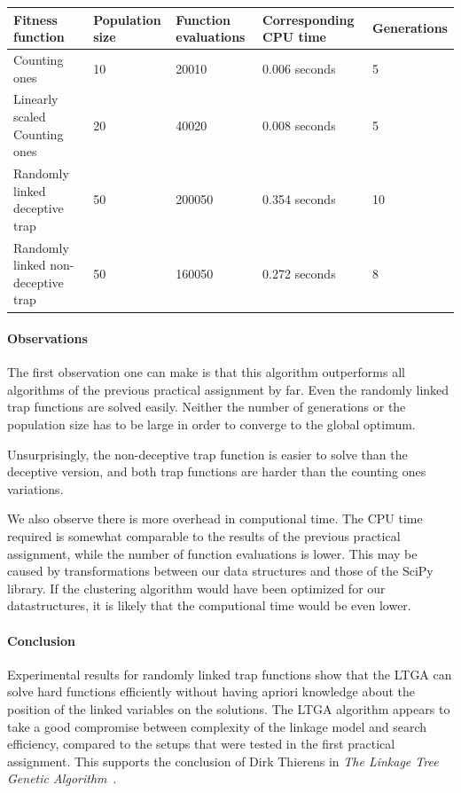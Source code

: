 \documentclass[12pt]{article}
\theoremstyle{definition}
\begin{document}
\begin{table}[!htb]
\begin{adjustwidth}{-2cm}{}
\centering
\begin{tabular}{lp{2.5cm}p{2.5cm}p{2.8cm}p{2.5cm}}
\toprule[1.5pt]
\bf Fitness function & \bf Population size & \bf Function evaluations & \bf Corresponding CPU time& \bf Generations\\\midrule
Counting ones & 10 & 20010 & 0.006 seconds & 5 \\
Linearly scaled Counting ones & 20 & 40020 & 0.008 seconds & 5 \\
Randomly linked deceptive trap & 50 & 200050 & 0.354 seconds & 10 \\
Randomly linked non-deceptive trap & 50 & 160050 & 0.272 seconds & 8 \\
\bottomrule[1.25pt]
\end{tabular}\par
\bigskip
{}
\label{tab:exp}
\end{adjustwidth}
\end{table}

\paragraph{Observations}
The first observation one can make is that this algorithm outperforms all algorithms of the
previous practical assignment by far.
Even the randomly linked trap functions are solved easily.
Neither the number of generations or the population size has to be large in order to
converge to the global optimum.

Unsurprisingly, the non-deceptive trap function is easier to solve than the deceptive version,
and both trap functions are harder than the counting ones variations.

We also observe there is more overhead in computional time.
The CPU time required is somewhat comparable to the results of the previous practical assignment,
while the number of function evaluations is lower.
This may be caused by transformations between our data structures and those of the SciPy library.
If the clustering algorithm would have been optimized for our datastructures,
it is likely that the computional time would be even lower.

\paragraph{Conclusion}
Experimental results for randomly linked trap functions show that the LTGA can solve hard functions efficiently without having apriori knowledge about the position of the linked variables on the solutions.
The LTGA algorithm appears to take a good compromise between complexity of the linkage model and search efficiency, compared to the setups that were tested in the first practical assignment.
This supports the conclusion of Dirk Thierens in \emph{The Linkage Tree Genetic Algorithm}~\cite{dirk}.
\end{document}
